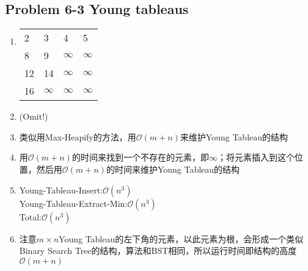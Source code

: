 \subsection*{Problem 6-3 Young tableaus}
\begin{enumerate}
	\item
		\begin{tabular}{llll}
			2 & 3 & 4 & 5 \\
			8 & 9 & $\infty$ & $\infty$ \\
			12 & 14 & $\infty$ & $\infty$ \\
			16 & $\infty$ & $\infty$ & $\infty$ \\
		\end{tabular}
	\item	(Omit!)
	\item	类似用Max-Heapify的方法，用$\mathcal{O}(m + n)$来维护Young Tableau的结构
	\item	用$\mathcal{O}(m + n)$的时间来找到一个不存在的元素，即$\infty$；将元素插入到这个位置，然后用$\mathcal{O}(m + n)$的时间来维护Young Tableau的结构
	\item	Young-Tableau-Insert:$\mathcal{O}(n^3)$ \\
		Young-Tableau-Extract-Min:$\mathcal{O}(n^3)$ \\
		Total:$\mathcal{O}(n^3)$
	\item	注意$m \times n$Young Tableau的左下角的元素，以此元素为根，会形成一个类似Binary Search Tree的结构，算法和BST相同，所以运行时间即结构的高度$\mathcal{O}(m + n)$
\end{enumerate}

